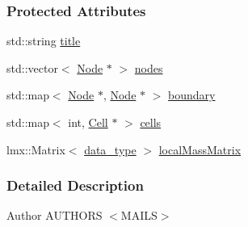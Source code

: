 \subsubsection*{Protected Attributes}
\begin{DoxyCompactItemize}
\item 
std\-::string \hyperlink{classmknix_1_1_body_a3c05cdff2d5f2b150046cd734d0ed7ce}{title}
\item 
std\-::vector$<$ \hyperlink{classmknix_1_1_node}{Node} $\ast$ $>$ \hyperlink{classmknix_1_1_body_a3393da3459cbf7b35ee3dedb982180bf}{nodes}
\item 
std\-::map$<$ \hyperlink{classmknix_1_1_node}{Node} $\ast$, \hyperlink{classmknix_1_1_node}{Node} $\ast$ $>$ \hyperlink{classmknix_1_1_body_abaacc346d058cdabb8d0273b1440e323}{boundary}
\item 
std\-::map$<$ int, \hyperlink{classmknix_1_1_cell}{Cell} $\ast$ $>$ \hyperlink{classmknix_1_1_body_afa538e2bc24cd6623e63b44704037a73}{cells}
\item 
lmx\-::\-Matrix$<$ \hyperlink{namespacemknix_a16be4b246fbf2cceb141e3a179111020}{data\-\_\-type} $>$ \hyperlink{classmknix_1_1_body_abf69d9fd5ede2c511d85c5d644902c6e}{local\-Mass\-Matrix}
\end{DoxyCompactItemize}


\subsubsection{Detailed Description}
\begin{DoxyAuthor}{Author}
A\-U\-T\-H\-O\-R\-S $<$\-M\-A\-I\-L\-S$>$ 
\end{DoxyAuthor}


